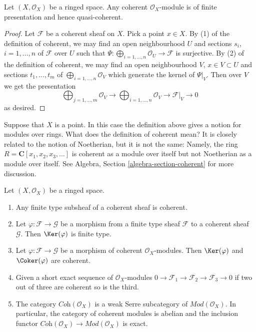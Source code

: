 \begin{lemma}
\label{lemma-coherent-finite-presentation}
Let $(X, \mathcal{O}_X)$ be a ringed space.
Any coherent $\mathcal{O}_X$-module is of finite presentation
and hence quasi-coherent.
\end{lemma}

\begin{proof}
Let $\mathcal{F}$ be a coherent sheaf on $X$.
Pick a point $x \in X$.
By (1) of the definition of coherent, we may find an open neighbourhood $U$
and sections $s_i$, $i = 1, \ldots, n$ of $\mathcal{F}$ over $U$
such that $\Psi : \bigoplus_{i = 1, \ldots, n} \mathcal{O}_U \to \mathcal{F}$
is surjective. By (2) of the definition of coherent, we may find
an open neighbourhood $V$, $x \in V \subset U$ and sections
$t_1, \ldots, t_m$ of $\bigoplus_{i = 1, \ldots, n} \mathcal{O}_V$
which generate the kernel of $\Psi|_V$. Then over $V$ we get the
presentation
$$
\bigoplus\nolimits_{j = 1, \ldots, m}
\mathcal{O}_V
\longrightarrow
\bigoplus\nolimits_{i = 1, \ldots, n}
\mathcal{O}_V
\to
\mathcal{F}|_V
\to
0
$$
as desired.
\end{proof}

\begin{example}
\label{example-coherent-not-Noetherian}
Suppose that $X$ is a point. In this case the definition
above gives a notion for modules over rings.
What does the definition of coherent mean?
It is closely related to the notion of Noetherian,
but it is not the same: Namely, the ring
$R = \mathbf{C}[x_1, x_2, x_3, \ldots]$ is coherent
as a module over itself but not Noetherian as a module
over itself. See Algebra, Section \ref{algebra-section-coherent}
for more discussion.
\end{example}

\begin{lemma}
\label{lemma-coherent-abelian}
Let $(X, \mathcal{O}_X)$ be a ringed space.
\begin{enumerate}
\item Any finite type subsheaf of a coherent sheaf is coherent.
\item Let $\varphi : \mathcal{F} \to \mathcal{G}$
be a morphism from a finite type sheaf $\mathcal{F}$
to a coherent sheaf $\mathcal{G}$. Then $\Ker(\varphi)$ is finite type.
\item Let $\varphi : \mathcal{F} \to \mathcal{G}$ be a morphism
of coherent $\mathcal{O}_X$-modules. Then
$\Ker(\varphi)$ and
$\Coker(\varphi)$ are coherent.
\item Given a short exact sequence of $\mathcal{O}_X$-modules
$0 \to \mathcal{F}_1 \to \mathcal{F}_2 \to \mathcal{F}_3 \to 0$
if two out of three are coherent so is the third.
\item The category $\textit{Coh}(\mathcal{O}_X)$ is a weak Serre subcategory
of $\textit{Mod}(\mathcal{O}_X)$. In particular, the category of
coherent modules is abelian and the inclusion functor
$\textit{Coh}(\mathcal{O}_X) \to \textit{Mod}(\mathcal{O}_X)$
is exact.
\end{enumerate}
\end{lemma}

